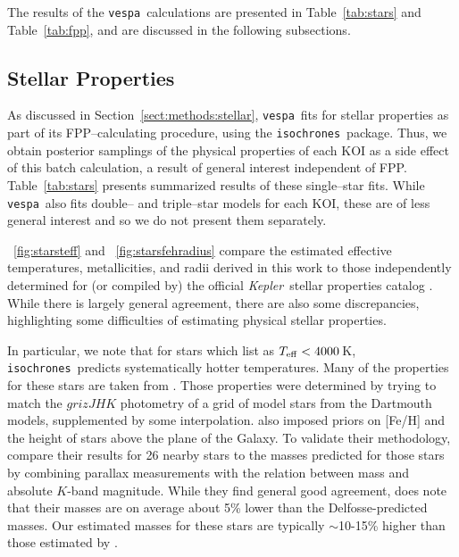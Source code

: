\documentclass{emulateapj}
\newcommand{\figref}[1]{\ref{fig:#1}}
\newcommand{\Fig}[1]{\figurename~\figref{#1}}
\newcommand{\fig}[1]{\Fig{#1}}
\newcommand{\Tab}[1]{Table~\ref{tab:#1}}
\newcommand{\tab}[1]{\Tab{#1}}
\newcommand{\sectionname}{Section}
\newcommand{\Sect}[1]{\sectionname~\ref{sect:#1}}
\newcommand{\sect}[1]{\Sect{#1}}
\newcommand{\sectlabel}[1]{\label{sect:#1}}
\newcommand{\kepler}{\textit{Kepler}}
\newcommand{\vespa}{\texttt{vespa}}
\newcommand{\isochrones}{\texttt{isochrones}}
\begin{document}
The results of the \vespa\ calculations are presented in
\tab{stars} and \tab{fpp}, and are discussed in
the following subsections.



\subsection{Stellar Properties}
\sectlabel{results:stars}

As discussed in \sect{methods:stellar}, \vespa\ fits for stellar
properties as part of its FPP--calculating procedure, using the
\isochrones\ package.  Thus, we obtain posterior samplings of the
physical properties of each KOI as a side effect of this batch
calculation, a result of general interest independent of FPP.
\tab{stars} presents summarized results of these single--star
fits.  While \vespa\ also fits double-- and triple--star models for
each KOI, these are of less general interest and so we do not
present them separately.

\fig{starsteff} and \fig{starsfehradius} compare the estimated
effective temperatures, metallicities, and radii derived in this work
to those independently determined for (or compiled by) the official
\kepler\ stellar properties catalog \citep[][hereafter
  ]{Huber:2014}.  While there is largely
general agreement, there are also some discrepancies, highlighting some
difficulties of estimating physical stellar properties.

In particular, we note that for stars which 
list as $T_{\rm eff} < 4000$\,K, \isochrones\ predicts systematically
hotter temperatures.  Many of the  properties
for these stars are taken from
\citet[][]{Dressing:2013}.  Those properties
were determined by trying to match the $grizJHK$ photometry
of a grid of model stars from the Dartmouth models, supplemented by
some interpolation.   also imposed priors
on [Fe/H] and the height of stars above the plane of the Galaxy.  To
validate their methodology,  compare their
results for 26 nearby stars to the masses predicted for those stars by
combining parallax measurements with the \citet{Delfosse:2000}
relation between mass and absolute $K$-band magnitude.  While they
find general good agreement,  does note that
their masses are on average about 5\% lower than the Delfosse-predicted
masses.  Our estimated masses for these stars are typically
$\sim$10-15\% higher than those estimated by .
\end{document}
